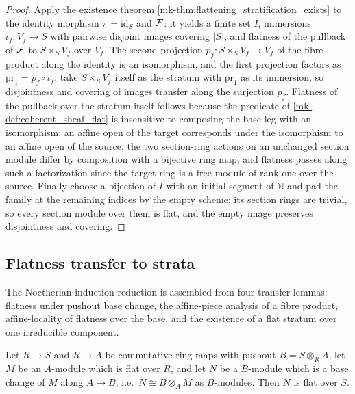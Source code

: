 \begin{proof}
  \leanok
  Apply the existence theorem \ref{mk-thm:flattening_stratification_exists} to
  the identity morphism \(\pi = \mathrm{id}_S\) and \(\mathcal{F}\): it yields a
  finite set \(I\), immersions \(\iota_f : V_f \to S\) with pairwise
  disjoint images covering \(|S|\), and flatness of the pullback of \(\mathcal{F}\)
  to \(S \times_S V_f\) over \(V_f\).  The second projection
  \(p_f : S \times_S V_f \to V_f\) of the fibre product along the identity
  is an isomorphism, and the first projection factors as
  \(\mathrm{pr}_1 = p_f \circ \iota_f\); take \(S \times_S V_f\) itself
  as the stratum with \(\mathrm{pr}_1\) as its immersion, so disjointness
  and covering of images transfer along the surjection \(p_f\).  Flatness of
  the pullback over the stratum itself follows because the predicate of
  \ref{mk-def:coherent_sheaf_flat} is insensitive to composing the base leg
  with an isomorphism: an affine open of the target corresponds under the
  isomorphism to an affine open of the source, the two section-ring actions
  on an unchanged section module differ by composition with a bijective ring
  map, and flatness passes along such a factorization since the target ring
  is a free module of rank one over the source.  Finally choose a bijection
  of \(I\) with an initial segment of \(\mathbb{N}\) and pad the family at
  the remaining indices by the empty scheme: its section rings are trivial,
  so every section module over them is flat, and the empty image preserves
  disjointness and covering.
\end{proof}

\subsection{Flatness transfer to strata}
\label{mk-subsec:flat_transfer_strata}

The Noetherian-induction reduction is assembled from four transfer lemmas:
flatness under pushout base change, the affine-piece analysis of a fibre
product, affine-locality of flatness over the base, and the existence of a
flat stratum over one irreducible component.

\begin{lemma}

  \label{mk-lem:flat_pushout_base_change}
  \leanok

  Let \(R \to S\) and \(R \to A\) be commutative ring maps with pushout
  \(B = S \otimes_R A\), let \(M\) be an \(A\)-module which is flat over
  \(R\), and let \(N\) be a \(B\)-module which is a base change of \(M\)
  along \(A \to B\), i.e.\ \(N \cong B \otimes_A M\) as \(B\)-modules.  Then
  \(N\) is flat over \(S\).
\end{lemma}

